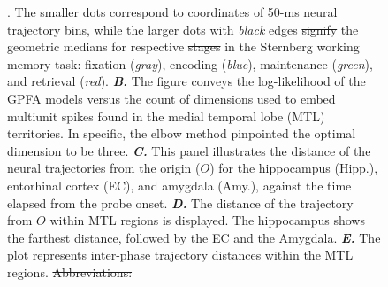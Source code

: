 \documentclass[final,3p,times,twocolumn]{elsarticle}
\providecommand{\DIFaddtex}[1]{{\protect\color{blue}\uwave{#1}}} %
\providecommand{\DIFdeltex}[1]{{\protect\color{red}\sout{#1}}}                      %
\providecommand{\DIFaddFL}[1]{\DIFadd{#1}} %
\providecommand{\DIFdelFL}[1]{\DIFdel{#1}} %
\providecommand{\DIFaddbeginFL}{} %
\providecommand{\DIFaddendFL}{} %
\providecommand{\DIFdelbeginFL}{} %
\providecommand{\DIFdelendFL}{} %
\providecommand{\DIFadd}[1]{\texorpdfstring{\DIFaddtex{#1}}{#1}} %
\providecommand{\DIFdel}[1]{\texorpdfstring{\DIFdeltex{#1}}{}} %
\newcommand{\DIFscaledelfig}{0.5}
\newlength{\DIFdelgraphicswidth} %
\newlength{\DIFdelgraphicsheight} %
\newcommand{\DIFaddincludegraphics}[2][]{{\color{blue}\fbox{\DIFOincludegraphics[#1]{#2}}}} %
\newcommand{\DIFdelincludegraphics}[2][]{%
\sbox{\DIFdelgraphicsbox}{\DIFOincludegraphics[#1]{#2}}%
\settoboxwidth{\DIFdelgraphicswidth}{\DIFdelgraphicsbox} %
\settoboxtotalheight{\DIFdelgraphicsheight}{\DIFdelgraphicsbox} %
\scalebox{\DIFscaledelfig}{%
\parbox[b]{\DIFdelgraphicswidth}{\usebox{\DIFdelgraphicsbox}\\[-\baselineskip] \rule{\DIFdelgraphicswidth}{0em}}\llap{\resizebox{\DIFdelgraphicswidth}{\DIFdelgraphicsheight}{%
\setlength{\unitlength}{\DIFdelgraphicswidth}%
\begin{picture}(1,1)%
\thicklines\linethickness{2pt} %
{\color[rgb]{1,0,0}\put(0,0){\framebox(1,1){}}}%
{\color[rgb]{1,0,0}\put(0,0){\line( 1,1){1}}}%
{\color[rgb]{1,0,0}\put(0,1){\line(1,-1){1}}}%
\end{picture}%
}\hspace*{3pt}}} %
} %
\DeclareRobustCommand{\DIFaddbeginFL}{\DIFOaddbeginFL \let\includegraphics\DIFaddincludegraphics} %
\DeclareRobustCommand{\DIFaddendFL}{\DIFOaddendFL \let\includegraphics\DIFOincludegraphics} %
\DeclareRobustCommand{\DIFdelbeginFL}{\DIFOdelbeginFL \let\includegraphics\DIFdelincludegraphics} %
\DeclareRobustCommand{\DIFdelendFL}{\DIFOaddendFL \let\includegraphics\DIFOincludegraphics} %
\begin{document}
\begin{figure}[ht]
{{}\DIFaddendFL . The smaller dots correspond to coordinates of 50-ms neural trajectory bins, while the larger dots with \textit{black} edges \DIFdelbeginFL \DIFdelFL{signify }\DIFdelendFL \DIFaddbeginFL \DIFaddFL{show }\DIFaddendFL the geometric medians for respective \DIFdelbeginFL \DIFdelFL{stages }\DIFdelendFL \DIFaddbeginFL \DIFaddFL{phases }\DIFaddendFL in the Sternberg working memory task: fixation (\DIFaddbeginFL \DIFaddFL{$\mathrm{\lVert g_{F} \rVert}$, }\DIFaddendFL \textit{gray}), encoding (\DIFaddbeginFL \DIFaddFL{$\mathrm{\lVert g_{E} \rVert}$, }\DIFaddendFL \textit{blue}), maintenance (\DIFaddbeginFL \DIFaddFL{$\mathrm{\lVert g_{M} \rVert}$, }\DIFaddendFL \textit{green}), and retrieval (\DIFaddbeginFL \DIFaddFL{$\mathrm{\lVert g_{R} \rVert}$, }\DIFaddendFL \textit{red}). \textbf{\textit{B.}} The figure conveys the log-likelihood of the GPFA models versus the count of dimensions used to embed multiunit spikes found in the medial temporal lobe (MTL) territories. In specific, the elbow method pinpointed the optimal dimension to be three. \textbf{\textit{C.}} This panel illustrates the distance of the neural trajectories from the origin ($O$) for the hippocampus (Hipp.), entorhinal cortex (EC), and amygdala (Amy.), against the time elapsed from the probe onset. \textbf{\textit{D.}} The distance of the trajectory from $O$ within MTL regions is displayed. The hippocampus shows the farthest distance, followed by the EC and the Amygdala. \textbf{\textit{E.}} The \DIFaddbeginFL \DIFaddFL{box }\DIFaddendFL plot represents inter-phase trajectory distances within the MTL regions.
\DIFdelbeginFL \DIFdelFL{Abbreviations:
}\DIFdelendFL }
        	\label{fig:02}
        \end{figure}
        \clearpage
\end{document}
